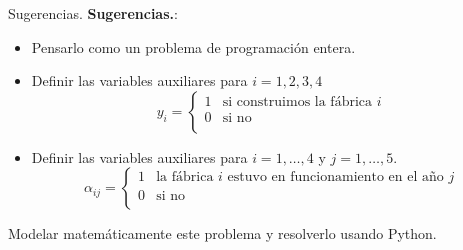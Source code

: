 \documentclass{beamer}
\begin{document}
\begin{frame}[fragile]{Sugerencias.}
  \textbf{Sugerencias.}:
  \begin{itemize}
    \item Pensarlo como un problema de programación entera.
    \item Definir las variables auxiliares para $i = 1, 2,3,4$
      \[
        y_{i} = 
        \begin{cases}
          1 & \text{si construimos la fábrica $i$} \\
          0 & \text{si no} \\
        \end{cases}
      \]
    \item Definir las variables auxiliares para $i=1,\dots,4$ y $j = 1, \dots, 5$.
      \[
        \alpha_{ij} = 
        \begin{cases}
          1 & \text{la fábrica $i$ estuvo en funcionamiento en el año $j$} \\
          0 & \text{si no} \\
        \end{cases}
      \]
  \end{itemize}
  \alert{Modelar matemáticamente este problema y resolverlo usando Python.}
\end{frame}
\end{document}
